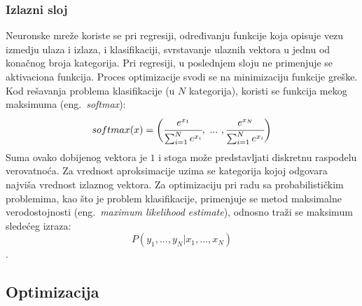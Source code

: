 \subsubsection{Izlazni sloj}

Neuronske mreže koriste se pri regresiji, određivanju funkcije koja opisuje vezu izmedju ulaza i izlaza, i klasifikaciji, svrstavanje ulaznih vektora u jednu od konačnog broja kategorija. Pri regresiji, u poslednjem sloju ne primenjuje se aktivaciona funkcija. Proces optimizacije svodi se na minimizaciju funkcije greške. Kod rešavanja problema klasifikacije (u $N$ kategorija), koristi se funkcija mekog maksimuma (eng.~{\em softmax}):
\begin{equation}
	softmax(x) = \bigg( \cfrac{e^{x_1}}{\sum_{i=1}^{N} e^{x_i}}, ~...~, \cfrac{e^{x_N}}{\sum_{i=1}^{N} e^{x_i}} \bigg)
\end{equation}
Suma ovako dobijenog vektora je $1$ i stoga može predstavljati diskretnu raspodelu verovatnoća. Za vrednost aproksimacije uzima se kategorija kojoj odgovara najviša vrednost izlaznog vektora. Za optimizaciju pri radu sa probabilističkim problemima, kao što je problem klasifikacije, primenjuje se metod maksimalne verodostojnosti (eng.~{\em maximum likelihood estimate}), odnosno traži se maksimum sledećeg izraza: 
\begin{equation}
	P(y_1, ..., y_N | x_1, ..., x_N)
\end{equation}.

\subsection{Optimizacija}
\label{subsec:optimizacija}

